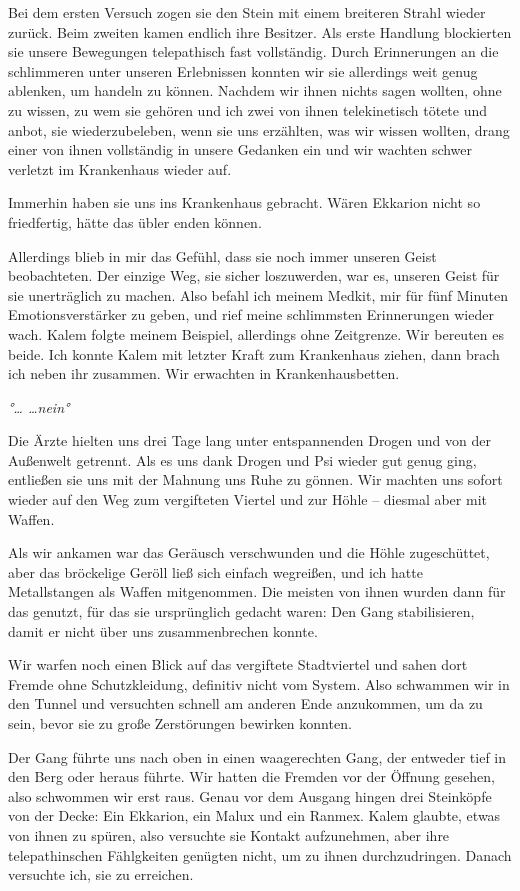 \documentclass[11pt]{scrartcl}
\begin{document}
Bei dem ersten Versuch zogen sie den Stein mit einem breiteren Strahl
wieder zurück. Beim zweiten kamen endlich ihre Besitzer. Als erste
Handlung blockierten sie unsere Bewegungen telepathisch fast
vollständig. Durch Erinnerungen an die schlimmeren unter unseren
Erlebnissen konnten wir sie allerdings weit genug ablenken, um handeln
zu können. Nachdem wir ihnen nichts sagen wollten, ohne zu wissen, zu
wem sie gehören und ich zwei von ihnen telekinetisch tötete und anbot,
sie wiederzubeleben, wenn sie uns erzählten, was wir wissen wollten,
drang einer von ihnen vollständig in unsere Gedanken ein und wir wachten
schwer verletzt im Krankenhaus wieder auf.

Immerhin haben sie uns ins Krankenhaus gebracht. Wären Ekkarion nicht so
friedfertig, hätte das übler enden können.

Allerdings blieb in mir das Gefühl, dass sie noch immer unseren Geist
beobachteten. Der einzige Weg, sie sicher loszuwerden, war es, unseren
Geist für sie unerträglich zu machen. Also befahl ich meinem Medkit, mir
für fünf Minuten Emotionsverstärker zu geben, und rief meine schlimmsten
Erinnerungen wieder wach. Kalem folgte meinem Beispiel, allerdings ohne
Zeitgrenze. Wir bereuten es beide. Ich konnte Kalem mit letzter Kraft
zum Krankenhaus ziehen, dann brach ich neben ihr zusammen. Wir erwachten
in Krankenhausbetten.

\emph{°\ldots{} \ldots{}nein°}

Die Ärzte hielten uns drei Tage lang unter entspannenden Drogen und von
der Außenwelt getrennt. Als es uns dank Drogen und Psi wieder gut genug
ging, entließen sie uns mit der Mahnung uns Ruhe zu gönnen. Wir machten
uns sofort wieder auf den Weg zum vergifteten Viertel und zur Höhle --
diesmal aber mit Waffen.

Als wir ankamen war das Geräusch verschwunden und die Höhle
zugeschüttet, aber das bröckelige Geröll ließ sich einfach wegreißen,
und ich hatte Metallstangen als Waffen mitgenommen. Die meisten von
ihnen wurden dann für das genutzt, für das sie ursprünglich gedacht
waren: Den Gang stabilisieren, damit er nicht über uns zusammenbrechen
konnte.

Wir warfen noch einen Blick auf das vergiftete Stadtviertel und sahen
dort Fremde ohne Schutzkleidung, definitiv nicht vom System. Also
schwammen wir in den Tunnel und versuchten schnell am anderen Ende
anzukommen, um da zu sein, bevor sie zu große Zerstörungen bewirken
konnten.

Der Gang führte uns nach oben in einen waagerechten Gang, der entweder
tief in den Berg oder heraus führte. Wir hatten die Fremden vor der
Öffnung gesehen, also schwommen wir erst raus. Genau vor dem Ausgang
hingen drei Steinköpfe von der Decke: Ein Ekkarion, ein Malux und ein
Ranmex. Kalem glaubte, etwas von ihnen zu spüren, also versuchte sie
Kontakt aufzunehmen, aber ihre telepathinschen Fählgkeiten genügten
nicht, um zu ihnen durchzudringen. Danach versuchte ich, sie zu
erreichen.
\end{document}
